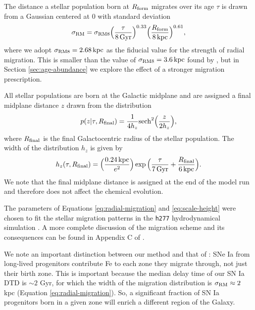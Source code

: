 \documentclass[twocolumn,twocolappendix,linenumbers]{aastex631}
\newcommand{\kpc}{\,{\rm kpc}}
\begin{document}
The distance a stellar population born at $R_{\rm form}$ migrates over its age $\tau$ is drawn from a Gaussian centered at 0 with standard deviation
\begin{equation}
    \sigma_{\rm RM} = \sigma_{\rm RM8} \Big(\frac{\tau}{8\,{\rm Gyr}}\Big)^{0.33} \Big(\frac{R_{\rm form}}{8\kpc}\Big)^{0.61},
    \label{eq:radial-migration}
\end{equation}
where we adopt $\sigma_{\rm RM8}=2.68\kpc$ as the fiducial value for the strength of radial migration. This is smaller than the value of $\sigma_{\rm RM8}=3.6\kpc$ found by \citet{frankel_measuring_2018}, but in Section \ref{sec:age-abundance} we explore the effect of a stronger migration prescription.

All stellar populations are born at the Galactic midplane and are assigned a final midplane distance $z$ drawn from the distribution
\begin{equation}
    p(z|\tau,R_{\rm final}) = \frac{1}{4 h_z} {\rm sech}^2\Big(\frac{z}{2 h_z}\Big),
    \label{eq:sech-pdf}
\end{equation}
where $R_{\rm final}$ is the final Galactocentric radius of the stellar population. The width of the distribution $h_z$ is given by
\begin{equation}
    h_z(\tau,R_{\rm final}) = \Big(\frac{0.24\kpc}{e^2}\Big) \exp\Big(\frac{\tau}{7\,{\rm Gyr}} + \frac{R_{\rm final}}{6\kpc}\Big).
    \label{eq:scale-height}
\end{equation}
We note that the final midplane distance is assigned at the end of the model run and therefore does not affect the chemical evolution.

The parameters of Equations \ref{eq:radial-migration} and \ref{eq:scale-height} were chosen to fit the stellar migration patterns in the {\tt h277} hydrodynamical simulation \citep{christensen_implementing_2012}. A more complete discussion of the migration scheme and its consequences can be found in Appendix C of \citet{dubay_galactic_2024}.

We note an important distinction between our method and that of \citet{spitoni_effect_2015}: SNe Ia from long-lived progenitors contribute Fe to each zone they migrate through, not just their birth zone. This is important because the median delay time of our SN Ia DTD is $\sim2$ Gyr, for which the width of the migration distribution is $\sigma_{\rm RM}\approx2$ kpc (Equation \ref{eq:radial-migration}). So, a significant fraction of SN Ia progenitors born in a given zone will enrich a different region of the Galaxy.
\end{document}
